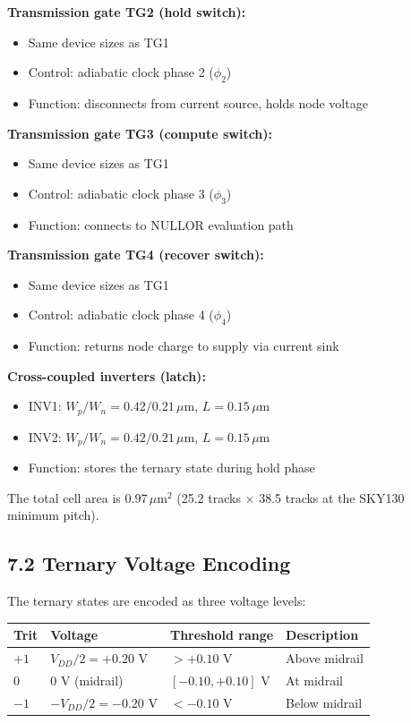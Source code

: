 \textbf{Transmission gate TG2 (hold switch):}
\begin{itemize}
\item Same device sizes as TG1
\item Control: adiabatic clock phase 2 (\(\phi_2\))
\item Function: disconnects from current source, holds node voltage
\end{itemize}

\textbf{Transmission gate TG3 (compute switch):}
\begin{itemize}
\item Same device sizes as TG1
\item Control: adiabatic clock phase 3 (\(\phi_3\))
\item Function: connects to NULLOR evaluation path
\end{itemize}

\textbf{Transmission gate TG4 (recover switch):}
\begin{itemize}
\item Same device sizes as TG1
\item Control: adiabatic clock phase 4 (\(\phi_4\))
\item Function: returns node charge to supply via current sink
\end{itemize}

\textbf{Cross-coupled inverters (latch):}
\begin{itemize}
\item INV1: \(W_p/W_n = 0.42/0.21\,\mu\)m, \(L = 0.15\,\mu\)m
\item INV2: \(W_p/W_n = 0.42/0.21\,\mu\)m, \(L = 0.15\,\mu\)m
\item Function: stores the ternary state during hold phase
\end{itemize}

The total cell area is \(0.97\,\mu\text{m}^2\) (25.2 tracks
\(\times\) 38.5 tracks at the SKY130 minimum pitch).

\subsection{7.2 Ternary Voltage Encoding}

The ternary states are encoded as three voltage levels:

\begin{longtable}[]{@{}
  >{\raggedright\arraybackslash}p{}
  >{\raggedright\arraybackslash}p{}
  >{\raggedright\arraybackslash}p{}
  >{\raggedright\arraybackslash}p{}@{}}
\toprule\noalign{}
Trit & Voltage & Threshold range & Description \\
\midrule\noalign{}
\endhead
\bottomrule\noalign{}
\endlastfoot
\(+1\) & \(V_{DD}/2 = +0.20\) V & \(> +0.10\) V & Above midrail \\
\(0\) & \(0\) V (midrail) & \([-0.10, +0.10]\) V & At midrail \\
\(-1\) & \(-V_{DD}/2 = -0.20\) V & \(< -0.10\) V & Below midrail \\
\end{longtable}

